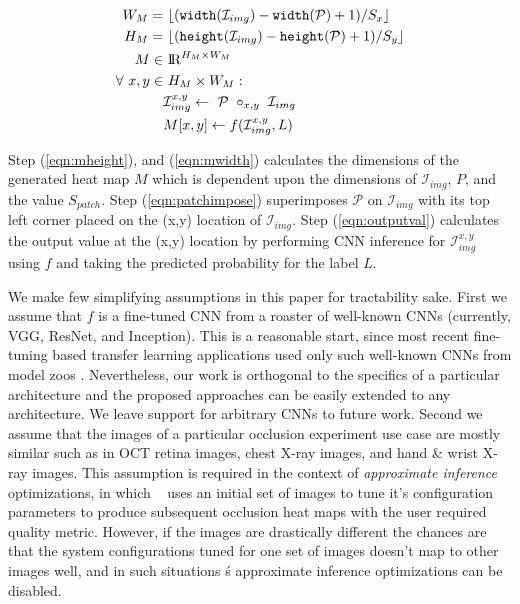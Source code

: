 \begin{align}
\label{eqn:mheight}
W_M =&~ \lfloor(\texttt{width}(\mathcal{I}_{img}) - \texttt{width}(\mathcal{P}) + 1)/S_{x}\rfloor\\
\label{eqn:mwidth}
H_M =&~ \lfloor(\texttt{height}(\mathcal{I}_{img}) - \texttt{height}(\mathcal{P}) + 1)/S_{y}\rfloor\\
M \in&~ \mathcal{\rm I\!R}^{H_M \times W_M}\\
\forall~ x,y \in&~ H_M \times W_M:\\
\label{eqn:patchimpose}
& \mathcal{I}_{img}^{x,y} \leftarrow ~\mathcal{P} ~\circ_{x,y} ~ \mathcal{I}_{img}\\
\label{eqn:outputval}
& M[x,y] \leftarrow f(\mathcal{I}_{img}^{x,y},L)
\end{align}

Step (\ref{eqn:mheight}), and (\ref{eqn:mwidth}) calculates the dimensions of the generated heat map $M$ which is dependent upon the dimensions of $\mathcal{I}_{img}$, $P$, and the value $S_{patch}$.
Step (\ref{eqn:patchimpose}) superimposes $\mathcal{P}$ on $\mathcal{I}_{img}$ with its top left corner placed on the (x,y) location of $\mathcal{I}_{img}$.
Step (\ref{eqn:outputval}) calculates the output value at the (x,y) location by performing CNN inference for $\mathcal{I}_{img}^{x,y}$ using $f$ and taking the predicted probability for the label $L$.

We make few simplifying assumptions in this paper for tractability sake.
First we assume that $f$ is a fine-tuned CNN from a roaster of well-known CNNs (currently, VGG, ResNet, and Inception).
This is a reasonable start, since most recent fine-tuning based transfer learning applications used only such well-known CNNs from model zoos \cite{caffemodelzoo, tfmodelzoo}.
Nevertheless, our work is orthogonal to the specifics of a particular architecture and the proposed approaches can be easily extended to any architecture.
We leave support for arbitrary CNNs to future work.
Second we assume that the images of a particular occlusion experiment use case are mostly similar such as in OCT retina images, chest X-ray images, and hand \& wrist X-ray images.
This assumption is required in the context of \textit{approximate inference} optimizations, in which \system~ uses an initial set of images to tune it's configuration parameters to produce subsequent occlusion heat maps with the user required quality metric.
However, if the images are drastically different the chances are that the system configurations tuned for one set of images doesn't map to other images well, and in such situations \system\'s approximate inference optimizations can be disabled.